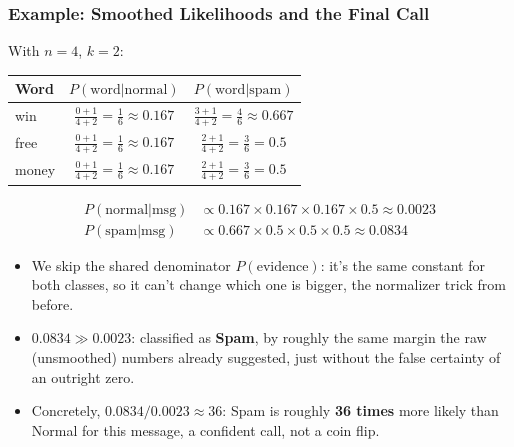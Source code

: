 \begin{frame}[fragile]\frametitle{Example: Smoothed Likelihoods and the Final Call}
With $n=4$, $k=2$:
\begin{center}
\begin{tabular}{l|c|c}
\textbf{Word} & \textbf{$P(\text{word}|\text{normal})$} & \textbf{$P(\text{word}|\text{spam})$} \\ \hline
win   & $\frac{0+1}{4+2}=\frac{1}{6}\approx0.167$ & $\frac{3+1}{4+2}=\frac{4}{6}\approx0.667$ \\
free  & $\frac{0+1}{4+2}=\frac{1}{6}\approx0.167$ & $\frac{2+1}{4+2}=\frac{3}{6}=0.5$ \\
money & $\frac{0+1}{4+2}=\frac{1}{6}\approx0.167$ & $\frac{2+1}{4+2}=\frac{3}{6}=0.5$
\end{tabular}
\end{center}
\begin{align*}
P(\text{normal}|\text{msg}) &\propto 0.167\times0.167\times0.167\times0.5 \approx 0.0023 \\
P(\text{spam}|\text{msg})   &\propto 0.667\times0.5\times0.5\times0.5 \approx 0.0834
\end{align*}
\begin{itemize}
\item We skip the shared denominator $P(\text{evidence})$: it's the same constant for both classes, so it can't change which one is bigger, the normalizer trick from before.
\item $0.0834 \gg 0.0023$: classified as \textbf{Spam}, by roughly the same margin the raw (unsmoothed) numbers already suggested, just without the false certainty of an outright zero.
\item Concretely, $0.0834/0.0023 \approx 36$: Spam is roughly \textbf{36 times} more likely than Normal for this message, a confident call, not a coin flip.
\end{itemize}
\end{frame}

